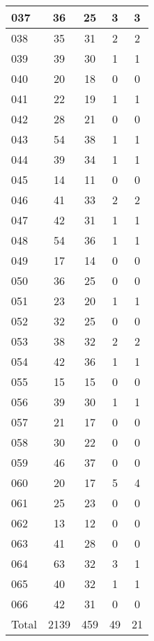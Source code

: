 \begin{center}
\begin{longtable}{l|c|c|c|c}
037 & 36 & 25 & 3 & 3\\ \hline
038 & 35 & 31 & 2 & 2\\ \hline
039 & 39 & 30 & 1 & 1\\ \hline
040 & 20 & 18 & 0 & 0\\ \hline
041 & 22 & 19 & 1 & 1\\ \hline
042 & 28 & 21 & 0 & 0\\ \hline
043 & 54 & 38 & 1 & 1\\ \hline
044 & 39 & 34 & 1 & 1\\ \hline
045 & 14 & 11 & 0 & 0\\ \hline
046 & 41 & 33 & 2 & 2\\ \hline
047 & 42 & 31 & 1 & 1\\ \hline
048 & 54 & 36 & 1 & 1\\ \hline
049 & 17 & 14 & 0 & 0\\ \hline
050 & 36 & 25 & 0 & 0\\ \hline
051 & 23 & 20 & 1 & 1\\ \hline
052 & 32 & 25 & 0 & 0\\ \hline
053 & 38 & 32 & 2 & 2\\ \hline
054 & 42 & 36 & 1 & 1\\ \hline
055 & 15 & 15 & 0 & 0\\ \hline
056 & 39 & 30 & 1 & 1\\ \hline
057 & 21 & 17 & 0 & 0\\ \hline
058 & 30 & 22 & 0 & 0\\ \hline
059 & 46 & 37 & 0 & 0\\ \hline
060 & 20 & 17 & 5 & 4\\ \hline
061 & 25 & 23 & 0 & 0\\ \hline
062 & 13 & 12 & 0 & 0\\ \hline
063 & 41 & 28 & 0 & 0\\ \hline
064 & 63 & 32 & 3 & 1\\ \hline
065 & 40 & 32 & 1 & 1\\ \hline
066 & 42 & 31 & 0 & 0\\ \hline
\hline \hline
Total & 2139 & 459 & 49 & 21



\end{longtable}
\end{center}
 
 



\scriptsize



